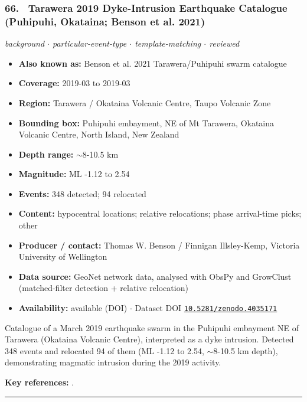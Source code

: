 \documentclass[10pt,a4paper]{article}
\newcommand{\catentryrule}{\par\vspace{3pt}\noindent\textcolor{rulegrey}{\rule{\linewidth}{0.3pt}}\par\vspace{5pt}}
\newcommand{\kv}[2]{\item \textbf{#1:} #2}
\begin{document}
\subsubsection*{\hypertarget{c:66}{66.}~ Tarawera 2019 Dyke-Intrusion Earthquake Catalogue (Puhipuhi, Okataina; Benson et al. 2021)}
{\small\itshape background $\cdot$ particular-event-type $\cdot$ template-matching $\cdot$ reviewed}\par\vspace{2pt}
\begin{itemize}[leftmargin=1.3em,itemsep=0.6pt,topsep=1pt,parsep=0pt]
\kv{Also known as}{Benson et al. 2021 Tarawera/Puhipuhi swarm catalogue}
\kv{Coverage}{2019-03 to 2019-03}
\kv{Region}{Tarawera / Okataina Volcanic Centre, Taupo Volcanic Zone}
\kv{Bounding box}{Puhipuhi embayment, NE of Mt Tarawera, Okataina Volcanic Centre, North Island, New Zealand}
\kv{Depth range}{$\sim$8-10.5 km}
\kv{Magnitude}{ML -1.12 to 2.54}
\kv{Events}{348 detected; 94 relocated}
\kv{Content}{hypocentral locations; relative relocations; phase arrival-time picks; other}
\kv{Producer / contact}{Thomas W. Benson / Finnigan Illsley-Kemp, Victoria University of Wellington}
\kv{Data source}{GeoNet network data, analysed with ObsPy and GrowClust (matched-filter detection + relative relocation)}
\kv{Availability}{available (DOI) $\cdot$ Dataset DOI \href{https://doi.org/10.5281/zenodo.4035171}{\nolinkurl{10.5281/zenodo.4035171}}}
\end{itemize}
\par\vspace{2pt}Catalogue of a March 2019 earthquake swarm in the Puhipuhi embayment NE of Tarawera (Okataina Volcanic Centre), interpreted as a dyke intrusion. Detected 348 events and relocated 94 of them (ML -1.12 to 2.54, $\sim$8-10.5 km depth), demonstrating magmatic intrusion during the 2019 activity.
\par\vspace{2pt}\textbf{Key references:} \cite{Benson2021,Benson2020}.
\catentryrule
\end{document}
